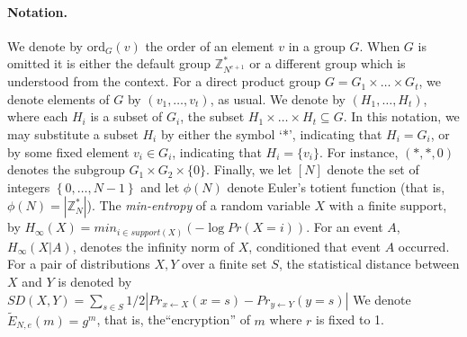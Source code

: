 \documentclass{article}
\newcommand{\order}{{\mathrm{ord}}}
\newcommand{\encdjnr}{{\tilde{E}}_{N,e}}
\newcommand{\set}[1]{\left\{#1\right\}}
\newcommand{\opbrange}[3][,]{#2#1\ldots#1#3}
\newcommand{\U}[1]{\mathbb{Z}_{#1}^*}
\begin{document}
\paragraph{Notation.} We denote by $\order_G(v)$ the order of an
element $v$ in a group $G$. When $G$ is omitted it is either the
default group $\U{N^{e+1}}$ or a different group which is
understood from the context. For a direct product group
$G=\opbrange[\times]{G_1}{G_t}$, we denote elements of $G$ by
$(\opbrange{v_1}{v_t})$, as usual.
We denote by $(\opbrange{H_1}{H_t})$, where each
$H_i$ is a subset of $G_i$, the subset
$\opbrange[\times]{H_1}{H_t}\subseteq G$. In this notation, we may
substitute a subset $H_i$ by either the symbol `*', indicating that
$H_i=G_i$, or by some fixed element $v_i\in G_i$, indicating that
$H_i=\{v_i\}$. For instance, $(*,*,0)$ denotes the subgroup
$G_1\times G_2\times \{0\}$. Finally, we let $[N]$ denote the set
of integers $\set{\opbrange{0}{N-1}}$ and let $\phi(N)$ denote
Euler's totient function (that is, $\phi(N)=|\U{N}|$). The \emph{min-entropy}
of a random variable $X$ with a finite support, by $H_\infty(X)=min_{i\in support(X)}(-\log{Pr(X=i)})$.
For an event $A$, $H_\infty(X|A)$, denotes the infinity norm of $X$, conditioned that event $A$ occurred. For a pair of distributions $X,Y$ over a finite set $S$, the statistical distance between $X$ and $Y$ is denoted by $SD(X,Y) = \sum_{s\in S}1/2|Pr_{x\leftarrow X}(x = s) - Pr_{y\leftarrow Y}(y = s)|$
We denote $\encdjnr(m)=g^m$, that is, the``encryption'' of $m$ where $r$ is fixed to 1.
\end{document}
